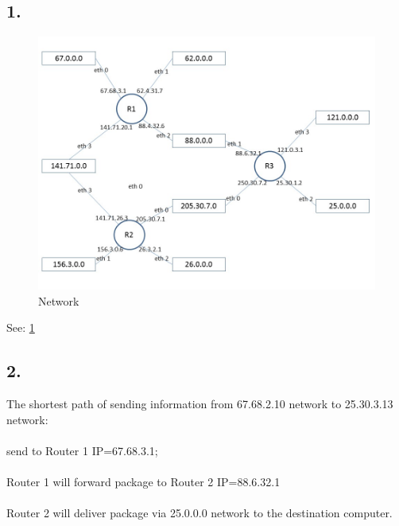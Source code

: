 \documentclass{WeSTassignment}
\begin{document}
\subsection*{1.}
\begin{figure}[ht!]
\centering
\includegraphics[width=\textwidth]{Assignment2_task2.jpg}
\caption{Network \label{overflow}}
\end{figure}

See: \ref{overflow}

\subsection*{2.}
The shortest path of sending information from 67.68.2.10 network to 25.30.3.13 network:\\ \\
send to Router 1 IP=67.68.3.1;\\ \\
Router 1 will forward package to Router 2 IP=88.6.32.1\\ \\
Router 2 will deliver package via 25.0.0.0 network to the destination computer.\\ \\

\end{document}
